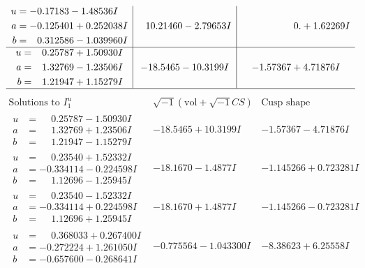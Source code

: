 \documentclass[1p]{elsarticle_modified}
\theoremstyle{definition}
\newcommand{\I}{\sqrt{-1}}
\begin{document}
$$\begin{array}{c|c|c}
\begin{aligned}
u &= -0.17183 - 1.48536 I \\
a &= -0.125401 + 0.252038 I \\
b &= \phantom{-}0.312586 - 1.039960 I\end{aligned}
 & \phantom{-}10.21460 - 2.79653 I & \phantom{-0.000000 -}0. + 1.62269 I \\ \hline\begin{aligned}
u &= \phantom{-}0.25787 + 1.50930 I \\
a &= \phantom{-}1.32769 - 1.23506 I \\
b &= \phantom{-}1.21947 + 1.15279 I\end{aligned}
 & -18.5465 - 10.3199 I & -1.57367 + 4.71876 I\\
 \hline 
 \end{array}$$\newpage$$\begin{array}{c|c|c}  
\text{Solutions to }I^u_{1}& \I (\text{vol} + \sqrt{-1}CS) & \text{Cusp shape}\\
 \hline 
\begin{aligned}
u &= \phantom{-}0.25787 - 1.50930 I \\
a &= \phantom{-}1.32769 + 1.23506 I \\
b &= \phantom{-}1.21947 - 1.15279 I\end{aligned}
 & -18.5465 + 10.3199 I & -1.57367 - 4.71876 I \\ \hline\begin{aligned}
u &= \phantom{-}0.23540 + 1.52332 I \\
a &= -0.334114 - 0.224598 I \\
b &= \phantom{-}1.12696 - 1.25945 I\end{aligned}
 & -18.1670 - 1.4877 I & -1.145266 + 0.723281 I \\ \hline\begin{aligned}
u &= \phantom{-}0.23540 - 1.52332 I \\
a &= -0.334114 + 0.224598 I \\
b &= \phantom{-}1.12696 + 1.25945 I\end{aligned}
 & -18.1670 + 1.4877 I & -1.145266 - 0.723281 I \\ \hline\begin{aligned}
u &= \phantom{-}0.368033 + 0.267400 I \\
a &= -0.272224 + 1.261050 I \\
b &= -0.657600 - 0.268641 I\end{aligned}
 & -0.775564 - 1.043300 I & -8.38623 + 6.25558 I \\ \hline\begin{aligned}

\end{aligned}
\end{array}$$
\end{document}
